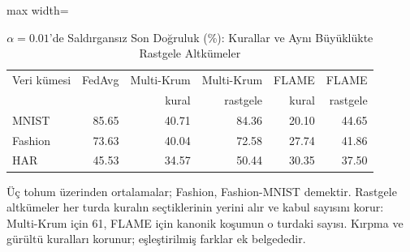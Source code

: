 \begin{table}[!t]
\centering\footnotesize
\setlength{\tabcolsep}{4pt}
\caption{$\alpha=0.01$'de Saldırgansız Son Doğruluk (\%): Kurallar ve Aynı Büyüklükte Rastgele Altkümeler}\label{tab:random}
\begin{adjustbox}{max width=\columnwidth}
\begin{tabular}{lrrrrr}
\toprule
Veri kümesi & FedAvg & Multi-Krum & Multi-Krum & FLAME & FLAME \\
 &  & kural & rastgele & kural & rastgele \\
\midrule
MNIST & 85.65 & 40.71 & 84.36 & 20.10 & 44.65 \\
Fashion & 73.63 & 40.04 & 72.58 & 27.74 & 41.86 \\
HAR & 45.53 & 34.57 & 50.44 & 30.35 & 37.50 \\
\bottomrule
\end{tabular}
\end{adjustbox}

\par\vspace{3pt}\parbox{\linewidth}{\footnotesize Üç tohum üzerinden ortalamalar; Fashion, Fashion-MNIST demektir. Rastgele altkümeler her turda kuralın seçtiklerinin yerini alır ve kabul sayısını korur: Multi-Krum için 61, FLAME için kanonik koşumun o turdaki sayısı. Kırpma ve gürültü kuralları korunur; eşleştirilmiş farklar ek belgededir.}
\end{table}
